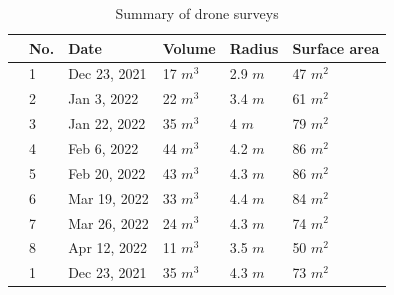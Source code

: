 \documentclass[tc, manuscript]{copernicus}
\begin{document}
\begin{table}
	\centering
	\caption{Summary of drone surveys}
	\label{tab:uav}
	\begin{tabular}{@{}|llllll|@{}}
		\toprule
		\textbf{}              & \textbf{No.} & \textbf{Date} & \textbf{Volume} & \textbf{Radius} & \textbf{Surface area} \\ \midrule
		\multicolumn{1}{|l|}{\multirow{8}{*}{\rotatebox[origin=c]{90}{Manual}}}
		                       & 1            & Dec 23, 2021  & 17 $m^{3}$     & 2.9 $m$
		                       & 47 $m^{2}$                                                                      \\
		\multicolumn{1}{|l|}{} & 2            & Jan 3, 2022  & 22 $m^{3}$     & 3.4 $m$
		                       & 61 $m^{2}$                                                                      \\
		\multicolumn{1}{|l|}{} & 3            & Jan 22, 2022   & 35 $m^{3}$     & 4 $m$
		                       & 79 $m^{2}$                                                                      \\
		\multicolumn{1}{|l|}{} & 4            & Feb 6, 2022  & 44 $m^{3}$     & 4.2 $m$
		                       & 86 $m^{2}$                                                                      \\
		\multicolumn{1}{|l|}{} & 5            & Feb 20, 2022  & 43 $m^{3}$     & 4.3 $m$
		                       & 86 $m^{2}$                                                                      \\
		\multicolumn{1}{|l|}{} & 6            & Mar 19, 2022  & 33 $m^{3}$     & 4.4 $m$
		                       & 84 $m^{2}$                                                                      \\
		\multicolumn{1}{|l|}{} & 7            & Mar 26, 2022  & 24 $m^{3}$     & 4.3 $m$
		                       & 74 $m^{2}$                                                                      \\
		\multicolumn{1}{|l|}{} & 8            & Apr 12, 2022  & 11 $m^{3}$     & 3.5 $m$
		                       & 50 $m^{2}$                                                                      
		\\\midrule
		\multicolumn{1}{|l|}{\multirow{6}{*}{\rotatebox[origin=c]{90}{Automated}}}
		                       & 1            & Dec 23, 2021  & 35 $m^{3}$      & 4.3 $m$
		                       & 73 $m^{2}$                                                                       \\

\end{tabular}
\end{table}
\end{document}
